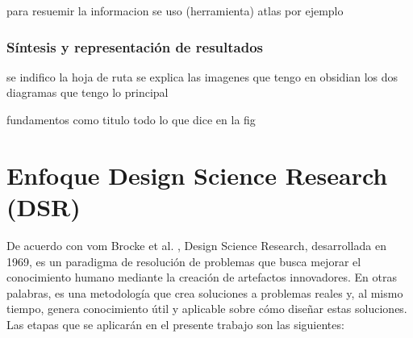 para resuemir la informacion se uso (herramienta) atlas por ejemplo

\subsubsection{Síntesis y representación de resultados}

se indifico la hoja de ruta se explica las imagenes que tengo en obsidian 
los dos diagramas que tengo lo principal

fundamentos como titulo todo lo que dice en la fig




\section{Enfoque Design Science Research (DSR)}
De acuerdo con vom Brocke et al. \cite{vomBrocke2020}, Design Science Research, desarrollada en 1969, es un paradigma de resolución de problemas que busca mejorar el conocimiento humano mediante la creación de artefactos innovadores. En otras palabras, es una metodología que crea soluciones a problemas reales y, al mismo tiempo, genera conocimiento útil y aplicable sobre cómo diseñar estas soluciones. Las etapas que se aplicarán en el presente trabajo son las siguientes:

